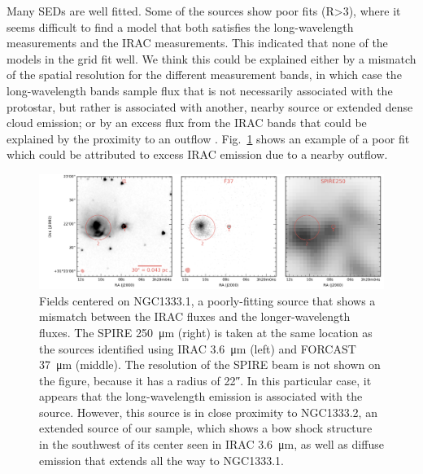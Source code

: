 Many SEDs are well fitted.
Some of the sources show poor fits (R>3), where it seems difficult to find a model that both satisfies the long-wavelength measurements and the IRAC measurements. This indicated that none of the models in the grid fit well. We think this could be explained either by a mismatch of the spatial resolution for the different measurement bands, in which case the long-wavelength bands sample flux that is not necessarily associated with the protostar, but rather is associated with another, nearby source or extended dense cloud emission; or by an excess flux from the IRAC bands that could be explained by the proximity to an outflow \citep{NoriegaCrespo:2004fe,Hudgins:2004wa}. Fig.~\ref{fig:NGC1333_Confusion} shows an example of a poor fit which could be attributed to excess IRAC emission due to a nearby outflow. 


\begin{figure}[!h]
\begin{center}
\includegraphics[width=\textwidth]{Figures/NGC1333_1_saturated_mosaic.png}
\caption[Confusion in NGC1333]{Fields centered on NGC1333.1, a poorly-fitting source that shows a mismatch between the IRAC fluxes and the longer-wavelength fluxes.  The \Herschel SPIRE \SI{250}{\um} (right) is taken at the same location as the sources identified using \Spitzer IRAC \SI{3.6}{\um} (left) and FORCAST \SI{37}{\um} (middle). The resolution of the SPIRE beam is not shown on the figure, because it has a radius of \ang{;;22}. In this particular case, it appears that the long-wavelength emission is associated with the source. However, this source is in close proximity to NGC1333.2, an extended source of our sample, which shows a bow shock structure in the southwest of its center seen in IRAC \SI{3.6}{\um}, as well as diffuse emission that extends all the way to NGC1333.1.}
\label{fig:NGC1333_Confusion}
\end{center}
\end{figure}


